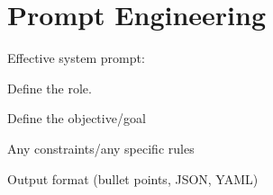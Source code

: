 \chapter{Prompt Engineering}

Effective system prompt:
\begin{numberedlist}
	\item Define the role.
	\item Define the objective/goal
	\item Any constraints/any specific rules
	\item Output format (bullet points, JSON, YAML)
\end{numberedlist}